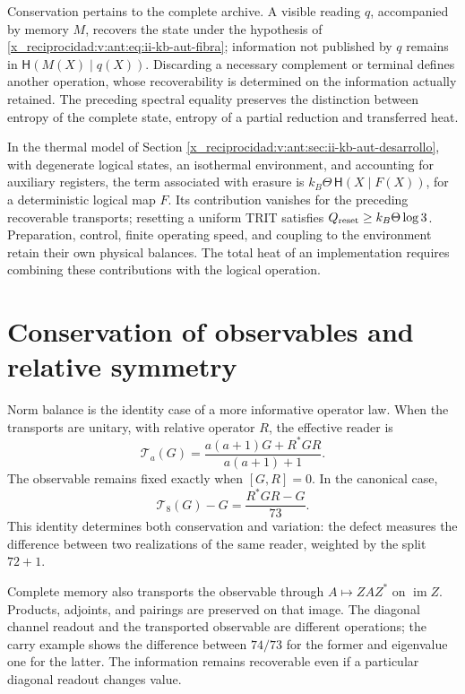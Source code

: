 Conservation pertains to the complete archive. A visible reading
\(q\), accompanied by memory \(M\), recovers the state under the
hypothesis of \eqref{x_reciprocidad:v:ant:eq:ii-kb-aut-fibra}; information not
published by \(q\) remains in
\(\mathsf H(M(X)\mid q(X))\). Discarding a necessary complement or
terminal defines another operation, whose recoverability is
determined on the information actually retained. The preceding spectral
equality preserves the distinction between entropy of the complete
state, entropy of a partial reduction and transferred heat.

In the thermal model of Section
\ref{x_reciprocidad:v:ant:sec:ii-kb-aut-desarrollo}, with degenerate logical states,
an isothermal environment, and accounting for auxiliary registers, the
term associated with erasure is
\(k_B\Theta\,\mathsf H(X\mid F(X))\), for a deterministic logical
map \(F\). Its contribution vanishes for the preceding recoverable
transports; resetting a uniform TRIT satisfies
\(Q_{\rm reset}\geq k_B\Theta\log3\). Preparation, control,
finite operating speed, and coupling to the environment retain their
own physical balances. The total heat of an implementation requires
combining these contributions with the logical operation.

\section{Conservation of observables and relative symmetry}
\label{x_reciprocidad:lib06:simetria}

Norm balance is the identity case of a more informative
operator law. When the transports are unitary, with relative operator
\(R\), the effective reader is
\begin{equation}
 \mathcal T_a(G)=\frac{a(a+1)G+R^*GR}{a(a+1)+1}.
 \label{x_reciprocidad:lib06:lector}
\end{equation}
The observable remains fixed exactly when \([G,R]=0\).
In the canonical case,
\begin{equation}
 \mathcal T_8(G)-G=\frac{R^*GR-G}{73}.
 \label{x_reciprocidad:lib06:defecto-lector}
\end{equation}
This identity determines both conservation and variation:
the defect measures the difference between two realizations of the same
reader, weighted by the split \(72+1\).

Complete memory also transports the observable through
\(A\mapsto ZAZ^*\) on \(\operatorname{im}Z\). Products,
adjoints, and pairings are preserved on that image. The diagonal
channel readout and the transported observable are different
operations; the carry example shows the difference between
\(74/73\) for the former and eigenvalue one for the latter.
The information remains recoverable even if a particular diagonal
readout changes value.

